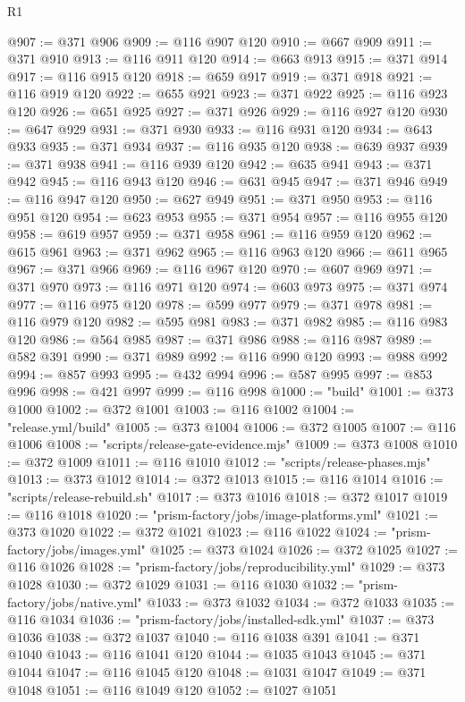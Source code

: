 \begin{lexlean}{R1}
\begin{coremodule}
@907 := @371 @906
@909 := @116 @907 @120
@910 := @667 @909
@911 := @371 @910
@913 := @116 @911 @120
@914 := @663 @913
@915 := @371 @914
@917 := @116 @915 @120
@918 := @659 @917
@919 := @371 @918
@921 := @116 @919 @120
@922 := @655 @921
@923 := @371 @922
@925 := @116 @923 @120
@926 := @651 @925
@927 := @371 @926
@929 := @116 @927 @120
@930 := @647 @929
@931 := @371 @930
@933 := @116 @931 @120
@934 := @643 @933
@935 := @371 @934
@937 := @116 @935 @120
@938 := @639 @937
@939 := @371 @938
@941 := @116 @939 @120
@942 := @635 @941
@943 := @371 @942
@945 := @116 @943 @120
@946 := @631 @945
@947 := @371 @946
@949 := @116 @947 @120
@950 := @627 @949
@951 := @371 @950
@953 := @116 @951 @120
@954 := @623 @953
@955 := @371 @954
@957 := @116 @955 @120
@958 := @619 @957
@959 := @371 @958
@961 := @116 @959 @120
@962 := @615 @961
@963 := @371 @962
@965 := @116 @963 @120
@966 := @611 @965
@967 := @371 @966
@969 := @116 @967 @120
@970 := @607 @969
@971 := @371 @970
@973 := @116 @971 @120
@974 := @603 @973
@975 := @371 @974
@977 := @116 @975 @120
@978 := @599 @977
@979 := @371 @978
@981 := @116 @979 @120
@982 := @595 @981
@983 := @371 @982
@985 := @116 @983 @120
@986 := @564 @985
@987 := @371 @986
@988 := @116 @987
@989 := @582 @391
@990 := @371 @989
@992 := @116 @990 @120
@993 := @988 @992
@994 := @857 @993
@995 := @432 @994
@996 := @587 @995
@997 := @853 @996
@998 := @421 @997
@999 := @116 @998
@1000 := "build"
@1001 := @373 @1000
@1002 := @372 @1001
@1003 := @116 @1002
@1004 := "release.yml/build"
@1005 := @373 @1004
@1006 := @372 @1005
@1007 := @116 @1006
@1008 := "scripts/release-gate-evidence.mjs"
@1009 := @373 @1008
@1010 := @372 @1009
@1011 := @116 @1010
@1012 := "scripts/release-phases.mjs"
@1013 := @373 @1012
@1014 := @372 @1013
@1015 := @116 @1014
@1016 := "scripts/release-rebuild.sh"
@1017 := @373 @1016
@1018 := @372 @1017
@1019 := @116 @1018
@1020 := "prism-factory/jobs/image-platforms.yml"
@1021 := @373 @1020
@1022 := @372 @1021
@1023 := @116 @1022
@1024 := "prism-factory/jobs/images.yml"
@1025 := @373 @1024
@1026 := @372 @1025
@1027 := @116 @1026
@1028 := "prism-factory/jobs/reproducibility.yml"
@1029 := @373 @1028
@1030 := @372 @1029
@1031 := @116 @1030
@1032 := "prism-factory/jobs/native.yml"
@1033 := @373 @1032
@1034 := @372 @1033
@1035 := @116 @1034
@1036 := "prism-factory/jobs/installed-sdk.yml"
@1037 := @373 @1036
@1038 := @372 @1037
@1040 := @116 @1038 @391
@1041 := @371 @1040
@1043 := @116 @1041 @120
@1044 := @1035 @1043
@1045 := @371 @1044
@1047 := @116 @1045 @120
@1048 := @1031 @1047
@1049 := @371 @1048
@1051 := @116 @1049 @120
@1052 := @1027 @1051

\end{coremodule}
\end{lexlean}

